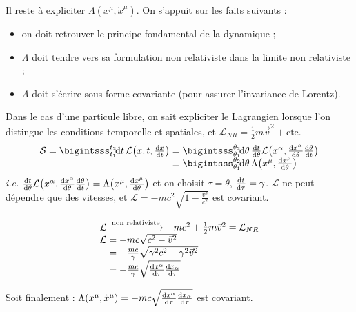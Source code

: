 Il reste à expliciter $\Lambda(x^\mu,\dot{x}^\mu)$. On s'appuit sur les faits suivants :
\begin{itemize}
	\item on doit retrouver le principe fondamental de la dynamique ;
	\item $\Lambda$ doit tendre vers sa formulation non relativiste dans la limite non relativiste ;
	\item $\Lambda$ doit s'écrire sous forme covariante (pour assurer l'invariance de Lorentz). 
\end{itemize}

{\txt Dans le cas d'une particule libre, on sait expliciter le Lagrangien lorsque l'on distingue les conditions temporelle et spatiales, et $\mathcal{L}_{NR}=\frac{1}{2}m\vec{v}^2+\mathrm{cte}$.}
$$
	\begin{array}{r@{\;}l}
		\mathcal{S}=\bigintsss_{t_1}^{t_2} \! \dif t\,\mathcal{L}\!\left(x,t,\frac{\dif x}{\dif t}\right) &= \bigintsss_{\theta_1}^{\theta_2} \!\dif \theta\,\frac{\dif t}{\dif\theta}\mathcal{L}\!\left(x^{\alpha},\frac{\dif x^{\alpha}}{\dif \theta}\frac{\dif\theta}{\dif t}\right)\\
		&\equiv  \bigintsss_{\theta_1}^{\theta_2} \!\dif \theta\,\Lambda\!\left(x^{\mu},\frac{\dif x^{\mu}}{\dif \theta}\right)
	\end{array}
$$
\emph{i.e.} $\frac{\mathrm{d} t}{\mathrm{d}\theta}\mathcal{L}\!\left(x^{\alpha},\frac{\mathrm{d} x^{\alpha}}{\mathrm{d} \theta}\frac{\mathrm{d}\theta}{\mathrm{d} t}\right) =\Lambda\!\left(x^{\mu},\frac{\mathrm{d} x^{\mu}}{\mathrm{d} \theta}\right)$ et on choisit $\tau=\theta$, $\frac{\mathrm{d} t}{\mathrm{d} \tau}=\gamma$.
$\mathcal{L}$ ne peut dépendre que des vitesses, et $\mathcal{L}=-mc^2\sqrt{1-\frac{v^2}{c^2}}$ est covariant.

$$
	\begin{array}{r@{\;}l}
		\mathcal{L}&\xrightarrow{\text{non relativiste}}-mc^2+\frac{1}{2}m\vec{v}^2=\mathcal{L}_{NR}\\
		\mathcal{L}&=-mc\sqrt{c^2-\vec{v}^2}\\
			&=-\frac{mc}{\gamma}\sqrt{\gamma^2c^2-\gamma^2\vec{v}^2}\\
			&=-\frac{mc}{\gamma}\sqrt{\frac{\dif x^{\alpha}}{\dif\tau}\frac{\dif x_{\alpha}}{\dif\tau}}
	\end{array}$$

Soit finalement : $\Lambda(x^\mu,\dot{x}^\mu)=-mc\sqrt{\frac{\mathrm{d} x^{\alpha}}{\mathrm{d}\tau}\frac{\mathrm{d} x_{\alpha}}{\mathrm{d}\tau}}$ est covariant.

